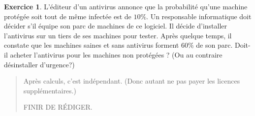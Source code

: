 \documentclass[11pt]{article}
\theoremstyle{definition}
\newtheorem{exo}{Exercice}
\newenvironment{solution}{\begin{quote}\color{teal}}{\end{quote}}
\begin{document}
\begin{exo}
L'éditeur d'un antivirus annonce que la probabilité qu'une machine protégée soit tout de même infectée est de $10\%$. Un responsable informatique doit décider s'il équipe son parc de machines de ce logiciel.  Il décide d'installer l'antivirus sur un tiers de ses machines pour tester. 
Après quelque temps, il constate que les machines saines et sans antivirus forment $60\%$ de son parc. 
Doit-il acheter l'antivirus pour les machines non protégées ? (Ou au contraire désinstaller d'urgence?)
\begin{solution}
Après calculs, c'est indépendant. (Donc autant ne pas payer les licences supplémentaires.)

FINIR DE RÉDIGER.
\end{solution}
\end{exo}
\end{document}
